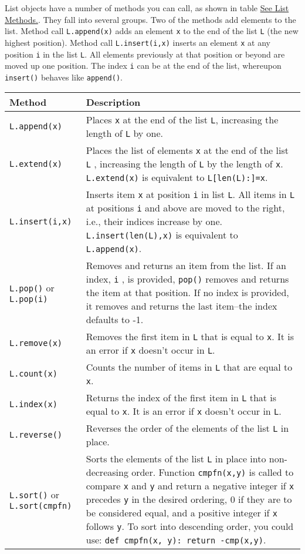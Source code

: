 List objects have a number of
methods you can call, as shown in table \href{chap2.html\#20881}{See List
Methods.}. They fall into several groups. Two of the methods add
elements to the list. Method call \texttt{L.append(x)} adds an element
\texttt{x} to the end of the list \texttt{L} (the new highest position).
Method call \texttt{L.insert(i,x)} inserts an element \texttt{x} at any
position \texttt{i} in the list \texttt{L}. All elements previously at that
position or beyond are moved up one position. The index \texttt{i} can be
at the end of the list, whereupon \texttt{insert()} behaves like
\texttt{append()}.


\begin{longtable}{l|p{7cm}}
\toprule
Method & Description \\
%
\midrule
\verb"L.append(x)" & Places \texttt{x} at the end of the list \texttt{L}, increasing the length of \texttt{L} by one. \\
%
\verb"L.extend(x)" & Places the list of elements \verb"x" at the end of the list \verb"L" , increasing the length of \verb"L" by the length of \verb"x". \verb"L.extend(x)" is equivalent to \verb"L[len(L):]=x". \\
%
\verb"L.insert(i,x)" &  Inserts item \texttt{x} at position \texttt{i} in list \texttt{L}.
All items in \texttt{L} at positions \texttt{i} and above are moved to the right, i.e., their indices increase by one.
\texttt{L.insert(len(L),x)} is equivalent to \texttt{L.append(x)}. \\
%
\verb"L.pop()" or \verb"L.pop(i)" &  Removes and returns an item from the list. If an index, \texttt{i} , is provided, \texttt{pop()} removes and returns the item at that position. If no index is provided, it removes and returns the last item--the index defaults to -1. \\
%
\verb"L.remove(x)" & Removes the first item in \texttt{L} that is equal to \texttt{x}. It is an error if \texttt{x} doesn't occur in \texttt{L}. \\ 
%
\verb"L.count(x)" & Counts the number of items in \texttt{L} that are equal to \texttt{x}. \\
\verb"L.index(x)" & Returns the index of the first item in \texttt{L} that is equal to \texttt{x}. It is an error if \texttt{x} doesn't occur in \texttt{L}. \\
%
\verb"L.reverse()" & Reverses the order of the elements of the list \texttt{L} in place. \\
%
\verb"L.sort()" or \verb"L.sort(cmpfn)" & Sorts the elements of the list  \texttt{L} in place into non- decreasing order. Function \texttt{cmpfn(x,y)} is called to compare \texttt{x} and \texttt{y} and return a negative integer  if \texttt{x} precedes \texttt{y} in the desired ordering, 0 if they are to  be considered equal, and a positive integer if \texttt{x} follows \texttt{y}. To sort into descending order, you could use: \verb"def cmpfn(x, y): return -cmp(x,y)". \\
\bottomrule
\end{longtable}
    
